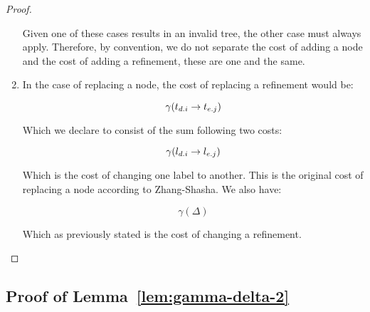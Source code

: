 \begin{proof}
\begin{enumerate}
              Given one of these cases results in an invalid tree, the other case must always apply. Therefore, by convention, we do not separate the cost of adding a node and the cost of adding a refinement, these are one and the same.

        \item In the case of replacing a node, the cost of replacing a refinement would be:

              $$\gamma({t_{{d}.{i}}} \rightarrow {t_{{e}.{j}}})$$

              Which we declare to consist of the sum following two costs:

              $$\gamma({l_{{d}.{i}}} \rightarrow {l_{{e}.{j}}})$$

              Which is the cost of changing one label to another. This is the original cost of replacing a node according to Zhang-Shasha. We also have:

              $$\gamma(\Delta)$$

              Which as previously stated is the cost of changing a refinement.



    \end{enumerate}

\end{proof}

\subsection{Proof of Lemma~\ref{lem:gamma-delta-2}}
\label{appendix:lem:gamma-delta-2}

